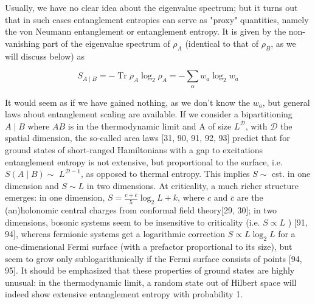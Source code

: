\documentclass[12pt]{article}
\begin{document}
Usually, we have no clear idea about the eigenvalue spectrum; but it turns out that in such cases entanglement entropies can serve as "proxy" quantities, namely the von Neumann entanglement or entanglement entropy. It is given by the non-vanishing part of the eigenvalue spectrum of $\rho_{A}$ (identical to that of $\rho_{B}$, as we will discuss below) as


\begin{equation*}
S_{A \mid B}=-\operatorname{Tr} \rho_{A} \log _{2} \rho_{A}=-\sum_{\alpha} w_{a} \log _{2} w_{a} \tag{17}
\end{equation*}


It would seem as if we have gained nothing, as we don't know the $w_{a}$, but general laws about entanglement scaling are available. If we consider a bipartitioning $A \mid B$ where $A B$ is in the thermodynamic limit and A of size $L^{\mathcal{D}}$, with $\mathcal{D}$ the spatial dimension, the so-called area laws [31, 90, 91, 92, 93] predict that for ground states of short-ranged Hamiltonians with a gap to excitations entanglement entropy is not extensive, but proportional to the surface, i.e. $S(A \mid B) \sim$ $L^{\mathcal{D}-1}$, as opposed to thermal entropy. This implies $S \sim$ cst. in one dimension and $S \sim L$ in two dimensions. At criticality, a much richer structure emerges: in one dimension, $S=\frac{c+\bar{c}}{5} \log _{2} L+k$, where $c$ and $\bar{c}$ are the (an)holonomic central charges from conformal field theory[29, 30]; in two dimensions, bosonic systems seem to be insensitive to criticality (i.e. $S \propto L$ ) [91, 94], whereas fermionic systems get a logarithmic correction $S \propto L \log _{2} L$ for a one-dimensional Fermi surface (with a prefactor proportional to its size), but seem to grow only sublogarithmically if the Fermi surface consists of points [94, 95]. It should be emphasized that these properties of ground states are highly unusual: in the thermodynamic limit, a random state out of Hilbert space will indeed show extensive entanglement entropy with probability 1.
\end{document}
